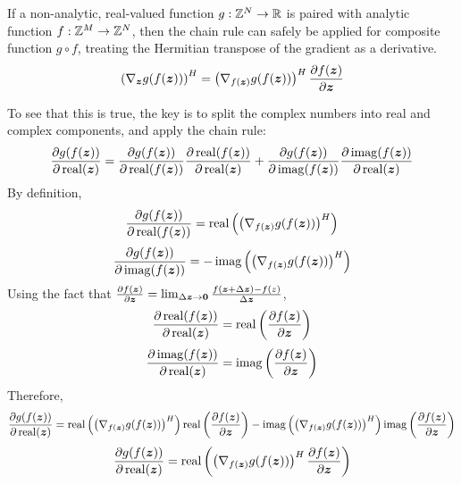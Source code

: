 \begin{appendices}
If a non-analytic, real-valued function $g: \mathbb{Z}^N \rightarrow \mathbb{R}$ is paired with analytic function $f: \mathbb{Z}^M \rightarrow \mathbb{Z}^N$, then the chain rule can safely be applied for composite function $g \circ f$, treating the Hermitian transpose of the gradient as a derivative.
\begin{equation} \label{equation:Complex Chain Rule}
\left(\nabla_{\bm{z}} g(f(\bm{z}))\right)^H = \left( \nabla_{f(\bm{z})} g(f(\bm{z}))\right)^H \frac{\partial f(\bm{z})}{\partial \bm{z}}
\end{equation}

To see that this is true, the key is to split the complex numbers into real and complex components, and apply the chain rule:
\begin{equation}
\frac{\partial g(f(\bm{z}))}{\partial \operatorname{real}(\bm{z})} = \frac{\partial g(f(\bm{z}))}{\partial \operatorname{real}(f(\bm{z}))}\frac{\partial \operatorname{real}(f(\bm{z}))}{\partial \operatorname{real}(\bm{z})} + \frac{\partial g(f(\bm{z}))}{\partial \operatorname{imag}(f(\bm{z}))}\frac{\partial \operatorname{imag}(f(\bm{z}))}{\partial \operatorname{real}(\bm{z})}
\end{equation}
By definition,
\begin{equation}
\frac{\partial g(f(\bm{z}))}{\partial \operatorname{real}(f(\bm{z}))} = \operatorname{real}\left(\left(\nabla_{f(\bm{z})} g(f(\bm{z}))\right)^H\right)
\end{equation}
\begin{equation}
\frac{\partial g(f(\bm{z}))}{\partial \operatorname{imag}(f(\bm{z}))} = -\operatorname{imag}\left(\left(\nabla_{f(\bm{z})} g(f(\bm{z}))\right)^H\right)
\end{equation}
Using the fact that $\frac{\partial f(\bm{z})}{\partial \bm{z}} = \lim_{\Delta \bm{z} \rightarrow \bm{0}} \frac{f(\bm{z} + \Delta \bm{z}) - f(z)}{\Delta \bm{z}}$,
\begin{equation}
\frac{\partial \operatorname{real}(f(\bm{z}))}{\partial \operatorname{real}(\bm{z})} = \operatorname{real}\left(\frac{\partial f(\bm{z})}{\partial \bm{z}}\right)
\end{equation}
\begin{equation}
\frac{\partial \operatorname{imag}(f(\bm{z}))}{\partial \operatorname{real}(\bm{z})} = \operatorname{imag}\left(\frac{\partial f(\bm{z})}{\partial \bm{z}}\right)
\end{equation}
Therefore,
\begin{equation}
\frac{\partial g(f(\bm{z}))}{\partial \operatorname{real}(\bm{z})} = \operatorname{real}\left(\left(\nabla_{f(\bm{z})} g(f(\bm{z}))\right)^H\right)\operatorname{real}\left(\frac{\partial f(\bm{z})}{\partial \bm{z}}\right) - \operatorname{imag}\left(\left(\nabla_{f(\bm{z})} g(f(\bm{z}))\right)^H\right)\operatorname{imag}\left(\frac{\partial f(\bm{z})}{\partial \bm{z}}\right)
\end{equation}
\begin{equation} \label{equation:Partial Derivative for Real Component}
\frac{\partial g(f(\bm{z}))}{\partial \operatorname{real}(\bm{z})} = \operatorname{real}\left(\left(\nabla_{f(\bm{z})} g(f(\bm{z}))\right)^H\frac{\partial f(\bm{z})}{\partial \bm{z}}\right)
\end{equation}


\end{appendices}
